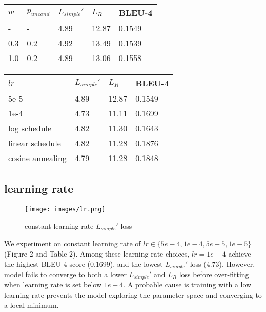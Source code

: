 \documentclass{article}
\begin{document}
\begin{minipage}[c]{0.5\textwidth}
\centering
\begin{tabular}{lllll}
\toprule
$w$ & $p_{uncond}$ & $L_{simple}'$ & $L_R$ & BLEU-4 \\
\midrule
- & - & 4.89 & 12.87 & 0.1549 \\
0.3 & 0.2 & 4.92 & 13.49 & 0.1539 \\
1.0 & 0.2 & 4.89 & 13.06 & 0.1558
\bottomrule
\end{tabular}
\label{tab:table1}
\end{minipage}
\begin{minipage}[c]{0.5\textwidth}
\centering
\begin{tabular}{llll}
\toprule
$lr$ & $L_{simple}'$ & $L_R$ & BLEU-4 \\
\midrule
5e-5 & 4.89 & 12.87 & 0.1549 \\
1e-4 & 4.73 & 11.11 & 0.1699  \\
log schedule & 4.82 & 11.30 & 0.1643 \\
linear schedule & 4.82 & 11.28 & 0.1876 \\
cosine annealing & 4.79 & 11.28 & 0.1848
\bottomrule
\end{tabular}
\label{tab:lr}
\end{minipage}

\subsection{learning rate}
\label{sec:lr-exp}
\begin{figure}
  \centering
  \texttt{[image: images/lr.png]}
  \caption{constant learning rate $L_{simple}'$ loss}
  \label{fig:fusion}
\end{figure}

We experiment on constant learning rate of $lr \in \{5e-4, 1e-4, 5e-5, 1e-5\}$ (Figure 2 and Table 2). Among these learning rate choices, $lr = 1e-4$ achieve the highest BLEU-4 score (0.1699), and the lowest $L_{simple}'$ loss (4.73). However, model fails to converge to both a lower $L_{simple}'$ and $L_R$ loss before over-fitting when learning rate is set below $1e-4$. A probable cause is training with a low learning rate prevents the model exploring the parameter space and converging to a local minimum.
\end{document}
